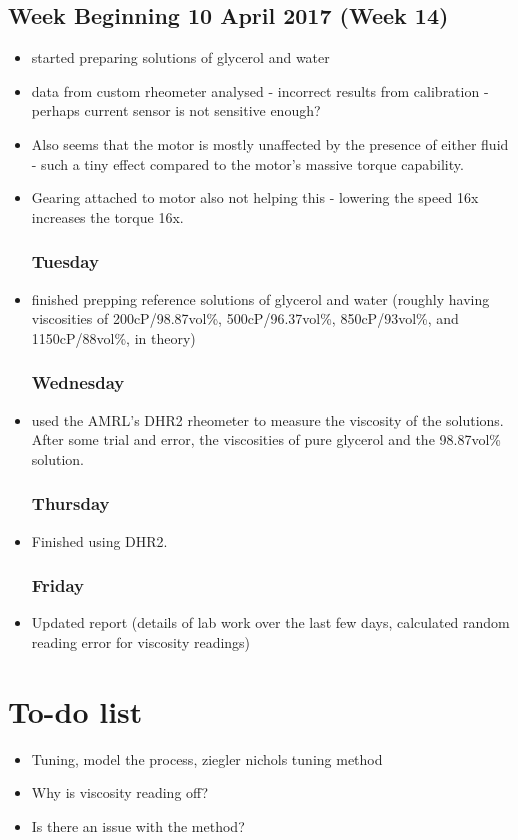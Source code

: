 \documentclass[a4]{report}
\def\mon{\subsection*{Monday}}
\def\tue{\subsection*{Tuesday}}
\def\wed{\subsection*{Wednesday}}
\def\thu{\subsection*{Thursday}}
\def\fri{\subsection*{Friday}}
\begin{document}
	\section{Week Beginning 10 April 2017 (Week 14)}
	\begin{itemize}
		\mon
		\item started preparing solutions of glycerol and water
		\item data from custom rheometer analysed - incorrect results from calibration - perhaps current sensor is not sensitive enough?
		\item Also seems that the motor is mostly unaffected by the presence of either fluid - such a tiny effect compared to the motor's massive torque capability.
		\item Gearing attached to motor also not helping this - lowering the speed 16x increases the torque 16x.
		\tue
		\item finished prepping reference solutions of glycerol and water (roughly having viscosities of 200cP/98.87vol\%, 500cP/96.37vol\%, 850cP/93vol\%, and 1150cP/88vol\%, in theory)
		\wed
		\item used the AMRL's DHR2 rheometer to measure the viscosity of the solutions. After some trial and error, the viscosities of pure glycerol and the 98.87vol\% solution.
		\thu
		\item Finished using DHR2.
		\fri
		\item Updated report (details of lab work over the last few days, calculated random reading error for viscosity readings)
	\end{itemize}
	\newpage
	\chapter{To-do list}
	\begin{itemize}
		\item Tuning, model the process, ziegler nichols tuning method
		\item Why is viscosity reading off?
		\item Is there an issue with the method?
	\end{itemize}
\end{document}
